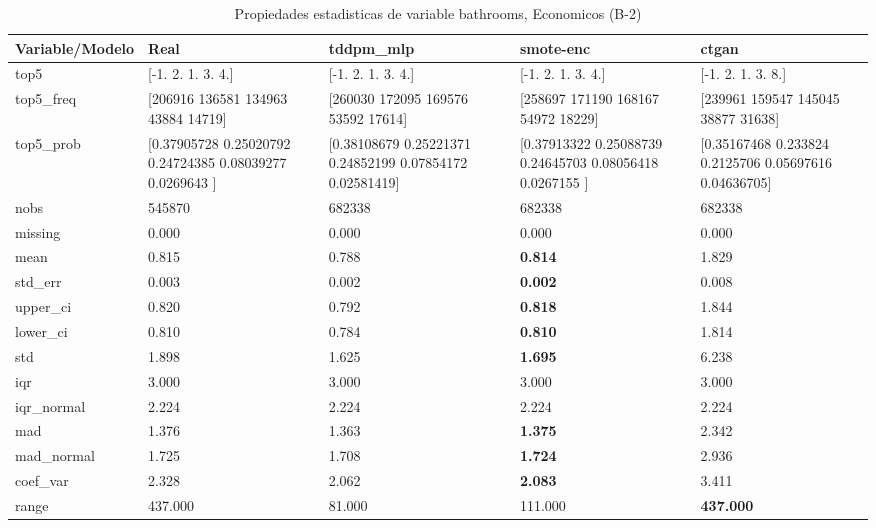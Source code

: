 \begin{table}[H]
\centering
\fontsize{8}{14}\selectfont
\caption{Propiedades  estadisticas de variable bathrooms, Economicos (B-2)}
\label{table-stats-economicos-b-2-bathrooms}
\begin{tabular}{|l|m{10em}|m{10em}|m{10em}|m{10em}|}
\hline
 \rowcolor[gray]{0.8}
Variable/Modelo & Real & tddpm\_mlp & smote-enc & ctgan \\
\hline top5 & [-1.  2.  1.  3.  4.] & [-1.  2.  1.  3.  4.] & [-1.  2.  1.  3.  4.] & [-1.  2.  1.  3.  8.] \\
\hline top5\_freq & [206916 136581 134963  43884  14719] & [260030 172095 169576  53592  17614] & [258697 171190 168167  54972  18229] & [239961 159547 145045  38877  31638] \\
\hline top5\_prob & [0.37905728 0.25020792 0.24724385 0.08039277 0.0269643 ] & [0.38108679 0.25221371 0.24852199 0.07854172 0.02581419] & [0.37913322 0.25088739 0.24645703 0.08056418 0.0267155 ] & [0.35167468 0.233824   0.2125706  0.05697616 0.04636705] \\
\hline nobs & 545870 & 682338 & 682338 & 682338 \\
\hline missing & 0.000 & 0.000 & 0.000 & 0.000 \\
\hline mean & 0.815 & 0.788 & \bfseries 0.814 & \cellcolor[rgb]{0.9, 0.54, 0.52} 1.829 \\
\hline std\_err & 0.003 & 0.002 & \bfseries 0.002 & \cellcolor[rgb]{0.9, 0.54, 0.52} 0.008 \\
\hline upper\_ci & 0.820 & 0.792 & \bfseries 0.818 & \cellcolor[rgb]{0.9, 0.54, 0.52} 1.844 \\
\hline lower\_ci & 0.810 & 0.784 & \bfseries 0.810 & \cellcolor[rgb]{0.9, 0.54, 0.52} 1.814 \\
\hline std & 1.898 & 1.625 & \bfseries 1.695 & \cellcolor[rgb]{0.9, 0.54, 0.52} 6.238 \\
\hline iqr & 3.000 & 3.000 & 3.000 & 3.000 \\
\hline iqr\_normal & 2.224 & 2.224 & 2.224 & 2.224 \\
\hline mad & 1.376 & 1.363 & \bfseries 1.375 & \cellcolor[rgb]{0.9, 0.54, 0.52} 2.342 \\
\hline mad\_normal & 1.725 & 1.708 & \bfseries 1.724 & \cellcolor[rgb]{0.9, 0.54, 0.52} 2.936 \\
\hline coef\_var & 2.328 & 2.062 & \bfseries 2.083 & \cellcolor[rgb]{0.9, 0.54, 0.52} 3.411 \\
\hline range & 437.000 & \cellcolor[rgb]{0.9, 0.54, 0.52} 81.000 & 111.000 & \bfseries 437.000 \\

\end{tabular}
\end{table}
